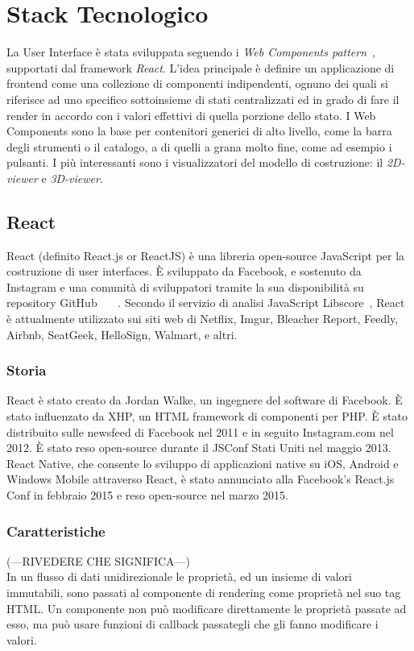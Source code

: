 \section{Stack Tecnologico}
\label{sec:chapter_2_section_3}

La User Interface è stata sviluppata seguendo i \emph{Web Components pattern}~\cite{web_components},
supportati dal framework \emph{React}.
L'idea principale è definire un applicazione di frontend come una collezione di componenti indipendenti,
ognuno dei quali si riferisce ad uno specifico sottoinsieme di stati centralizzati ed in grado
di fare il render in accordo con i valori effettivi di quella porzione dello stato.
I Web Components sono la base per contenitori generici di alto livello, come la barra degli strumenti o il catalogo,
a di quelli a grana molto fine, come ad esempio i pulsanti. I più interessanti sono i visualizzatori del
modello di costruzione: il \emph{2D-viewer} e \emph{3D-viewer}.

\subsection{React}
\label{sec:chapter_2_section_3_sub_1}
React (definito React.js or ReactJS) è una libreria open-source JavaScript per la costruzione di user interfaces.
\`E sviluppato da Facebook, e sostenuto da Instagram e una comunità di sviluppatori tramite la sua disponibilità su repository GitHub
~\cite{infoworld}~\cite{facebookreact}~\cite{reactjs}. Secondo il servizio di analisi JavaScript Libscore~\cite{libscope},
React è attualmente utilizzato sui  siti web di Netflix, Imgur, Bleacher Report, Feedly, Airbnb, SeatGeek,
HelloSign, Walmart, e altri.


\subsubsection{Storia}
React è stato creato da Jordan Walke, un ingegnere del software di Facebook. \`E stato influenzato da XHP, un HTML
framework di componenti per PHP. \`E stato distribuito sulle newsfeed di Facebook nel 2011 e in seguito
Instagram.com nel 2012. \`E stato reso open-source durante il JSConf Stati Uniti nel maggio 2013.
React Native, che consente lo sviluppo di applicazioni native su iOS, Android e Windows Mobile attraverso React,
è stato annunciato alla Facebook's React.js Conf in febbraio 2015 e reso open-source nel marzo 2015.

\subsubsection{Caratteristiche}
(---RIVEDERE CHE SIGNIFICA---)\\
In un flusso di dati unidirezionale le propriet\`a, ed un insieme di valori immutabili, sono passati al
componente di rendering come propriet\`a nel suo tag HTML.
Un componente non pu\`o modificare direttamente le propriet\`a passate ad esso, ma pu\`o usare funzioni di
callback passategli che gli fanno modificare i valori.

